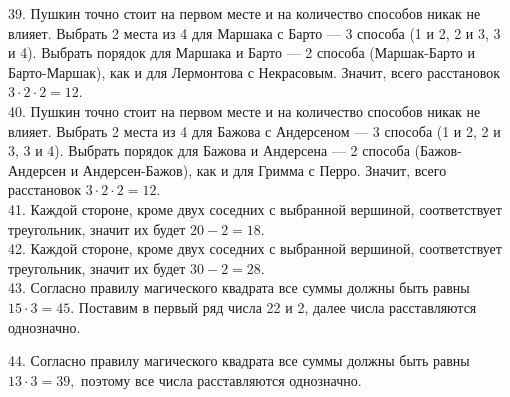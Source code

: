 \documentclass[12pt]{article}
\begin{document}
39. Пушкин точно стоит на первом месте и на количество способов никак не влияет. Выбрать 2 места из 4 для Маршака с Барто --- 3 способа (1 и 2, 2 и 3, 3 и 4). Выбрать порядок для Маршака и Барто --- 2 способа (Маршак-Барто и Барто-Маршак), как и для  Лермонтова с Некрасовым. Значит, всего расстановок $3\cdot2\cdot2=12.$\\
40. Пушкин точно стоит на первом месте и на количество способов никак не влияет. Выбрать 2 места из 4 для Бажова с Андерсеном --- 3 способа (1 и 2, 2 и 3, 3 и 4). Выбрать порядок для Бажова и Андерсена --- 2 способа (Бажов-Андерсен и Андерсен-Бажов), как и для  Гримма с Перро. Значит, всего расстановок $3\cdot2\cdot2=12.$\\
41. Каждой стороне, кроме двух соседних с выбранной вершиной, соответствует треугольник, значит их будет $20-2=18.$\\
42. Каждой стороне, кроме двух соседних с выбранной вершиной, соответствует треугольник, значит их будет $30-2=28.$\\
43. Согласно правилу магического квадрата все суммы должны быть равны $15\cdot3=45.$ Поставим в первый ряд числа 22 и 2, далее числа расставляются однозначно.
\begin{center}
\begin{figure}[ht!]
\end{figure}
\end{center}
44. Согласно правилу магического квадрата все суммы должны быть равны $13\cdot3=39,$ поэтому все числа расставляются однозначно.
\begin{center}
\begin{figure}[ht!]
\end{figure}
\end{center}
\end{document}
